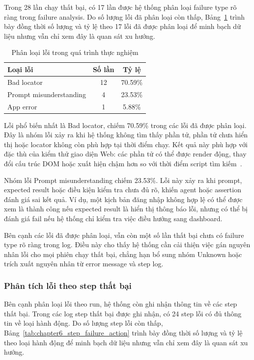 Trong 28 lần chạy thất bại, có 17 lần được hệ thống phân loại failure type rõ ràng trong failure analysis. Do số lượng lỗi đã phân loại còn thấp, Bảng~\ref{tab:chapter6_failure_analysis} trình bày đồng thời số lượng và tỷ lệ theo 17 lỗi đã được phân loại để minh bạch dữ liệu nhưng vẫn chỉ xem đây là quan sát xu hướng.

\begin{table}[H]
\centering
\caption{Phân loại lỗi trong quá trình thực nghiệm}
\label{tab:chapter6_failure_analysis}
\renewcommand{\arraystretch}{1.2}
\begin{tabular}{|p{6.5cm}|c|c|}
\hline
\textbf{Loại lỗi} & \textbf{Số lần} & \textbf{Tỷ lệ} \\
\hline
Bad locator & 12 & 70.59\% \\
\hline
Prompt misunderstanding & 4 & 23.53\% \\
\hline
App error & 1 & 5.88\% \\
\hline
\end{tabular}
\end{table}

Lỗi phổ biến nhất là Bad locator, chiếm 70.59\% trong các lỗi đã được phân loại. Đây là nhóm lỗi xảy ra khi hệ thống không tìm thấy phần tử, phần tử chưa hiển thị hoặc locator không còn phù hợp tại thời điểm chạy. Kết quả này phù hợp với đặc thù của kiểm thử giao diện Web: các phần tử có thể được render động, thay đổi cấu trúc DOM hoặc xuất hiện chậm hơn so với thời điểm script tìm kiếm~\cite{9402129}.

Nhóm lỗi Prompt misunderstanding chiếm 23.53\%. Lỗi này xảy ra khi prompt, expected result hoặc điều kiện kiểm tra chưa đủ rõ, khiến agent hoặc assertion đánh giá sai kết quả. Ví dụ, một kịch bản đăng nhập không hợp lệ có thể được xem là thành công nếu expected result là hiển thị thông báo lỗi, nhưng có thể bị đánh giá fail nếu hệ thống chỉ kiểm tra việc điều hướng sang dashboard.

Bên cạnh các lỗi đã được phân loại, vẫn còn một số lần thất bại chưa có failure type rõ ràng trong log. Điều này cho thấy hệ thống cần cải thiện việc gán nguyên nhân lỗi cho mọi phiên chạy thất bại, chẳng hạn bổ sung nhóm Unknown hoặc trích xuất nguyên nhân từ error message và step log.

\subsubsection{Phân tích lỗi theo step thất bại}

Bên cạnh phân loại lỗi theo run, hệ thống còn ghi nhận thông tin về các step thất bại. Trong các log step thất bại được ghi nhận, có 24 step lỗi có đủ thông tin về loại hành động. Do số lượng step lỗi còn thấp, Bảng~\ref{tab:chapter6_step_failure_action} trình bày đồng thời số lượng và tỷ lệ theo loại hành động để minh bạch dữ liệu nhưng vẫn chỉ xem đây là quan sát xu hướng.

